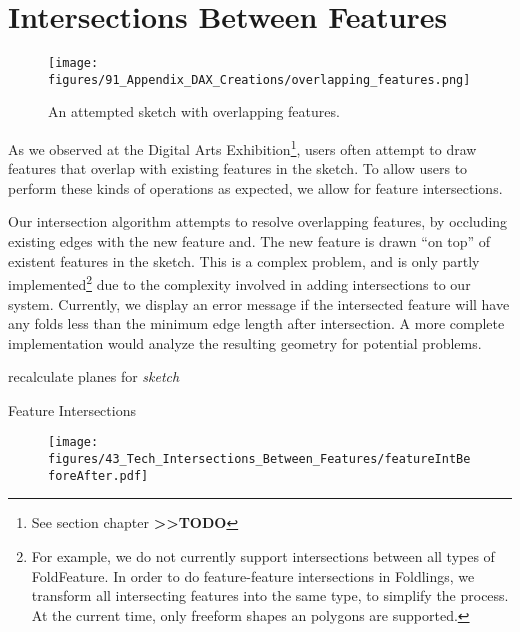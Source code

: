 \section{Intersections Between
Features}\label{intersections-between-features}

\begin{figure}[htbp]
\centering
\texttt{[image: figures/91\_Appendix\_DAX\_Creations/overlapping\_features.png]}
\caption{An attempted sketch with overlapping features.}
\end{figure}

As we observed at the Digital Arts Exhibition\footnote{See section
  chapter \textbf{\textgreater{}\textgreater{}TODO}}, users often
attempt to draw features that overlap with existing features in the
sketch. To allow users to perform these kinds of operations as expected,
we allow for feature intersections.

Our intersection algorithm attempts to resolve overlapping features, by
occluding existing edges with the new feature and. The new feature is
drawn ``on top'' of existent features in the sketch. This is a complex
problem, and is only partly implemented\footnote{For example, we do not
  currently support intersections between all types of FoldFeature. In
  order to do feature-feature intersections in Foldlings, we transform
  all intersecting features into the same type, to simplify the process.
  At the current time, only freeform shapes an polygons are supported.}
due to the complexity involved in adding intersections to our system.
Currently, we display an error message if the intersected feature will
have any folds less than the minimum edge length after intersection. A
more complete implementation would analyze the resulting geometry for
potential problems.

\begin{algorithm}[H]

recalculate planes for \textit{sketch}
\
\
\caption{Feature Intersections}
\end{algorithm}

\begin{figure}[htbp]
\centering
\texttt{[image: figures/43\_Tech\_Intersections\_Between\_Features/featureIntBeforeAfter.pdf]}
\caption{}
\end{figure}
